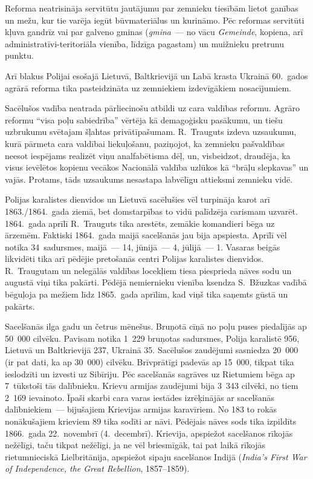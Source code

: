 \documentclass[twoside,a5paper,12pt,fleqn,openany]{extbook}
\newcommand{\pltxti}[1]{\textit{\textpolish{#1}}}
\newcommand{\detxti}[1]{\textit{\textgerman{#1}}}
\newcommand{\entxti}[1]{\textit{\textenglish{#1}}}
\begin{document}
Reforma neatrisināja servitūtu jautājumu par zemnieku tiesībām lietot ganības un mežu, kur tie varēja iegūt būvmateriālus un kurināmo. Pēc reformas servitūti kļuva gandrīz vai par galveno gminas (\pltxti{gmina}~--- no vācu \detxti{Gemeinde}, kopiena, arī administratīvi-teritoriāla vienība, līdzīga pagastam) un muižnieku pretrunu punktu.

Arī blakus Polijai esošajā Lietuvā, Baltkrievijā un Labā krasta Ukrainā 60.~gados agrārā reforma tika pasteidzināta uz zemniekiem izdevīgākiem nosacījumiem.

Sacēlušos vadība neatrada pārliecinošu atbildi uz cara valdības reformu. Agrāro reformu ``visa poļu sabiedrība'' vērtēja kā demagoģisku pasākumu, un tiešu uzbrukumu svētajam šļahtas privātīpašumam. R.~Trauguts izdeva uzsaukumu, kurā pārmeta cara valdībai liekuļošanu, paziņojot, ka zemnieku pašvaldības neesot iespējams realizēt viņu analfabētisma dēļ, un, visbeidzot, draudēja, ka visus ievēlētos kopienu vecākos Nacionālā valdība uzlūkos kā ``brāļu slepkavas'' un vajās. Protams, tāds uzsaukums nesastapa labvēlīgu attieksmi zemnieku vidē.

Polijas karalistes dienvidos un Lietuvā sacēlušies vēl turpināja karot arī 1863./1864.~gada ziemā, bet domstarpības to vidū palīdzēja carismam uzvarēt. 1864.~gada aprīlī R.~Trauguts tika arestēts, zemākie komandieri bēga uz ārzemēm. Faktiski 1864.~gada maijā sacelšanās jau bija apspiesta. Aprīlī vēl notika 34~sadursmes, maijā~--- 14, jūnijā~--- 4, jūlijā~--- 1. Vasaras beigās likvidēti tika arī pēdējie pretošanās centri Polijas karalistes dienvidos. R.~Traugutam un nelegālās valdības locekļiem tiesa piesprieda nāves sodu un augustā viņi tika pakārti. Pēdējā nemiernieku vienība ksendza S.~Bžuzkas vadībā bēguļoja pa mežiem līdz 1865.~gada aprīlim, kad viņš tika saņemts gūstā un pakārts.

Sacelšanās ilga gadu un četrus mēnešus. Bruņotā cīņā no poļu puses piedalījās ap 50~000 cilvēku. Pavisam notika 1~229 bruņotas sadursmes, Polija karalistē 956, Lietuvā un Baltkrievijā 237, Ukrainā 35. Sacēlušos zaudējumi sasniedza 20~000 (ir pat dati, ka ap 30~000) cilvēku. Brīvprātīgi padevās ap 15~000, tikpat tika ieslodzīti un izvesti uz Sibīriju. Pēc sacelšanās sagrāves uz Rietumiem bēga ap 7~tūkstoši tās dalībnieku. Krievu armijas zaudējumi bija 3~343 cilvēki, no tiem 2~169 ievainoto. Īpaši skarbi cara varas iestādes izrēķinājās ar sacelšanās dalībniekiem~--- bijušajiem Krievijas armijas karavīriem. No 183 to rokās nonākušajiem krieviem 89 tika sodīti ar nāvi. Pēdējais nāves sods tika izpildīts 1866.~gada 22.~novembrī (4.~decembrī). Krievija, apspiežot sacelšanos rīkojās nežēlīgi, taču tikpat nežēlīgi, ja ne vēl briesmīgāk, tai pat laikā rīkojās rietumnieciskā Lielbritānija, apspiežot sipaju sacelšanos Indijā (\entxti{India's First War of Independence, the Great Rebellion}, 1857--1859).
\end{document}
